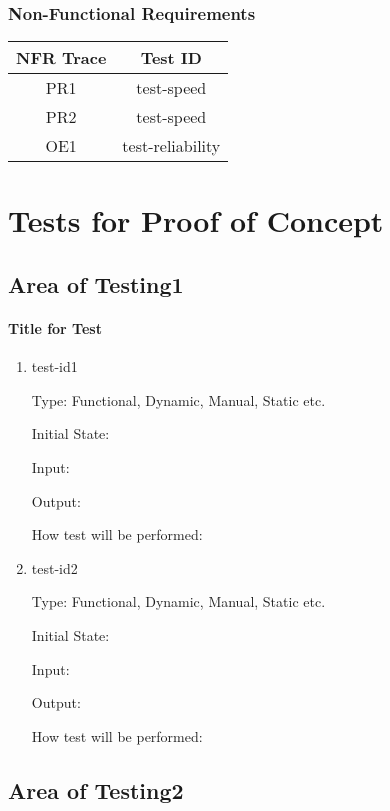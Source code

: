\documentclass[12pt, titlepage]{article}
\begin{document}
\subsubsection{Non-Functional Requirements}
\begin{center}
\begin{tabular}{ |c|c| } 
 \hline
 NFR Trace & Test ID \\ 
  \hline
   \hline
PR1 & test-speed \\ 
  \hline
PR2 & test-speed \\ 
  \hline
OE1 & test-reliability \\ 
 \hline
\end{tabular}
\end{center}
\section{Tests for Proof of Concept}

\subsection{Area of Testing1}
		
\paragraph{Title for Test}

\begin{enumerate}

\item{test-id1\\}

Type: Functional, Dynamic, Manual, Static etc.
					
Initial State: 
					
Input: 
					
Output: 
					
How test will be performed: 
					
\item{test-id2\\}

Type: Functional, Dynamic, Manual, Static etc.
					
Initial State: 
					
Input: 
					
Output: 
					
How test will be performed: 

\end{enumerate}

\subsection{Area of Testing2}
\end{document}
